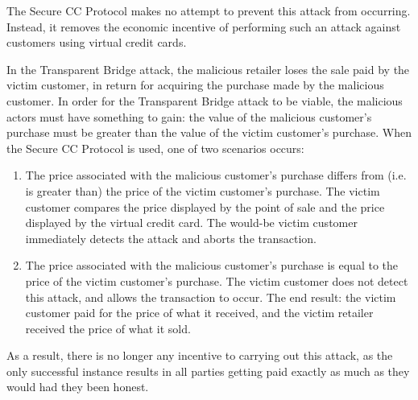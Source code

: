 The Secure CC Protocol makes no attempt to prevent this attack from occurring.
Instead, it removes the economic incentive of performing such an attack against customers using virtual credit cards.

In the Transparent Bridge attack, the malicious retailer loses the sale paid by the victim customer, in return for acquiring the purchase made by the malicious customer.
In order for the Transparent Bridge attack to be viable, the malicious actors must have something to gain:
  the value of the malicious customer's purchase must be greater than the value of the victim customer's purchase.
When the Secure CC Protocol is used, one of two scenarios occurs:

\begin{enumerate}
\item The price associated with the malicious customer's purchase differs from (i.e. is greater than) the price of the victim customer's purchase.
The victim customer compares the price displayed by the point of sale and the price displayed by the virtual credit card.
The would-be victim customer immediately detects the attack and aborts the transaction.
\item The price associated with the malicious customer's purchase is equal to the price of the victim customer's purchase.
The victim customer does not detect this attack, and allows the transaction to occur.
The end result: the victim customer paid for the price of what it received, and the victim retailer received the price of what it sold.
\end{enumerate}

As a result, there is no longer any incentive to carrying out this attack, as the only successful instance results in all parties getting paid exactly as much as they would had they been honest.
